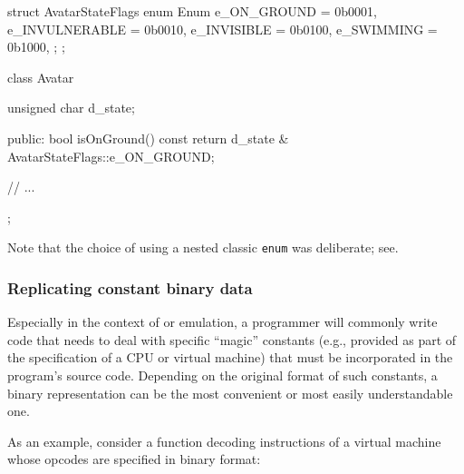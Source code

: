 %
%
%
\begin{emcppslisting}
struct AvatarStateFlags
{
    enum Enum
    {
        e_ON_GROUND    = 0b0001,
        e_INVULNERABLE = 0b0010,
        e_INVISIBLE    = 0b0100,
        e_SWIMMING     = 0b1000,
    };
};

class Avatar
{
    unsigned char d_state;

public:
    bool isOnGround() const
    {
        return d_state & AvatarStateFlags::e_ON_GROUND;
    }

    // ...
};
\end{emcppslisting}

\noindent Note that the choice of using a nested classic \lstinline!enum! was deliberate;
see\linebreak[4] .


\subsubsection[Replicating constant binary data]{Replicating constant binary data}\label{replicating-constant-binary-data}

Especially in the context of  or emulation,
a programmer will commonly write code that needs to deal
with specific ``magic'' constants (e.g., provided as part of the
specification of a CPU or virtual machine) that must be incorporated in
the program's source code. Depending on the original format of such
constants, a binary representation can be the most convenient or most
easily understandable one.

As an example, consider a function decoding instructions of a virtual
machine whose opcodes are specified in binary format:


